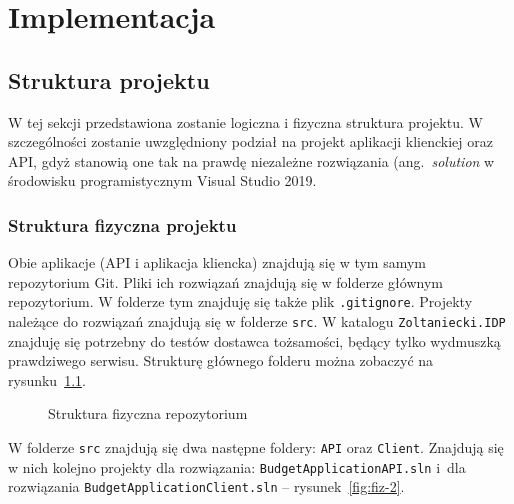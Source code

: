 \chapter{Implementacja}
\label{chap:implementacja}

\section{Struktura projektu}
\label{sec:struktura-projektu}

W tej sekcji przedstawiona zostanie logiczna i fizyczna struktura projektu. W szczególności zostanie uwzględniony podział na projekt aplikacji klienckiej oraz API, gdyż stanowią one tak na prawdę niezależne rozwiązania (ang.~\emph{solution} w środowisku programistycznym Visual Studio 2019.

\subsection{Struktura fizyczna projektu}
\label{sec:struktura-fizyczna-projektu}

Obie aplikacje (API i aplikacja kliencka) znajdują się w tym samym repozytorium Git. Pliki ich rozwiązań znajdują się w folderze głównym repozytorium. W folderze tym znajduję się także plik \texttt{.gitignore}. Projekty należące do rozwiązań znajdują się w folderze \texttt{src}. W katalogu \texttt{Zoltaniecki.IDP} znajduję się potrzebny do testów dostawca tożsamości, będący tylko wydmuszką prawdziwego serwisu. Strukturę głównego folderu można zobaczyć na rysunku~\ref{fig:fiz-1}.

\begin{figure}[b]
	\centering
	\caption{Struktura fizyczna repozytorium}
	\label{fig:fiz-1}
\end{figure}

W folderze \texttt{src} znajdują się dwa następne foldery: \texttt{API} oraz \texttt{Client}. Znajdują się w nich kolejno projekty dla rozwiązania: \texttt{BudgetApplicationAPI.sln} i~dla rozwiązania \texttt{BudgetApplicationClient.sln} -- rysunek~\ref{fig:fiz-2}. 

